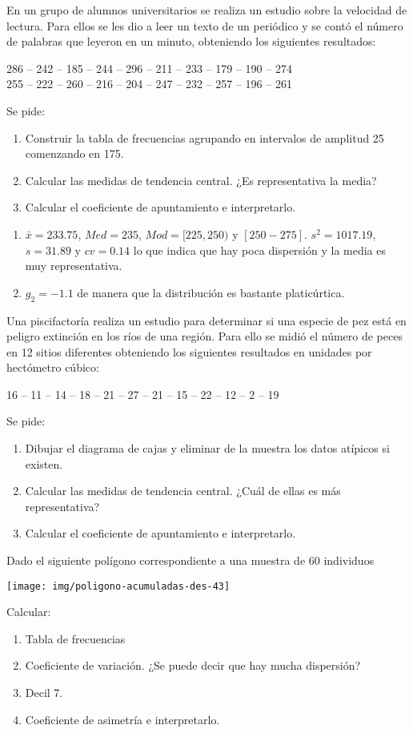 {En un grupo de alumnos universitarios se realiza un estudio sobre la velocidad de lectura.
Para ellos se les dio a leer un texto de un periódico y se contó el número de palabras que leyeron en un minuto, obteniendo los siguientes resultados:
\begin{center}
286 -- 242 -- 185 -- 244 -- 296 -- 211 -- 233 -- 179 -- 190 -- 274 \\
255 -- 222 -- 260 -- 216 -- 204 -- 247 -- 232 -- 257 -- 196 -- 261
\end{center}
Se pide:
\begin{enumerate}
\item Construir la tabla de frecuencias agrupando en intervalos de amplitud 25 comenzando en 175.
\item Calcular las medidas de tendencia central. ¿Es representativa la media?
\item Calcular el coeficiente de apuntamiento e interpretarlo.
\end{enumerate}
}
{\begin{enumerate}[start=2]
\item $\bar{x}=233.75$, $Med=235$, $Mod= [225,250)$ y $[250-275]$. $s^2=1017.19$, $s=31.89$ y $cv=0.14$ lo que indica que hay poca dispersión y la media es muy representativa.
\item $g_2=-1.1$ de manera que la distribución es bastante platicúrtica.
\end{enumerate}
}
{}


{Una piscifactoría realiza un estudio para determinar si una especie de pez está en peligro extinción en los ríos de una región.
Para ello se midió el número de peces en 12 sitios diferentes obteniendo los siguientes resultados en unidades por hectómetro cúbico:
\begin{center}
  16 -- 11 -- 14 -- 18 -- 21 -- 27 -- 21 -- 15 -- 22 -- 12 -- 2 -- 19
\end{center}
Se pide:
\begin{enumerate}
\item Dibujar el diagrama de cajas y eliminar de la muestra los datos atípicos si existen.
\item Calcular las medidas de tendencia central. ¿Cuál de ellas es más representativa?
\item Calcular el coeficiente de apuntamiento e interpretarlo.
\end{enumerate}
}


{Dado el siguiente polígono correspondiente a una muestra de 60 individuos
\begin{center}
\texttt{[image: img/poligono-acumuladas-des-43]}
\end{center}
Calcular:
\begin{enumerate}
\item Tabla de frecuencias
\item Coeficiente de variación. ¿Se puede decir que hay mucha dispersión?
\item Decil 7.
\item Coeficiente de asimetría e interpretarlo.
\end{enumerate}
}


